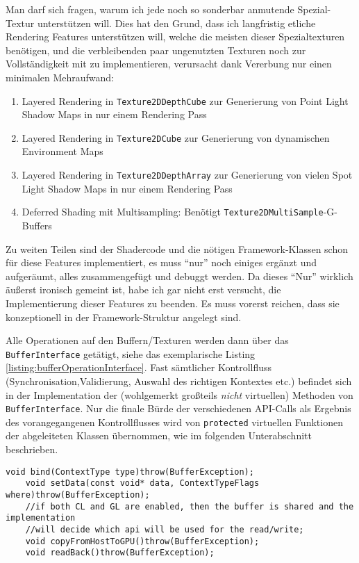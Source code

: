 	Man darf sich fragen, warum ich jede noch so sonderbar anmutende Spezial-Textur unterstützen will. Dies
	hat den Grund, dass ich langfristig etliche Rendering Features unterstützen will, welche die meisten dieser 	
	Spezialtexturen benötigen, und die verbleibenden paar ungenutzten Texturen noch zur Vollständigkeit mit zu 
	implementieren, verursacht dank Vererbung nur einen minimalen Mehraufwand:
	\begin{enumerate}
		\item Layered Rendering in \lstinline|Texture2DDepthCube| zur Generierung von Point Light Shadow Maps
		in nur einem Rendering Pass
		\item Layered Rendering in \lstinline|Texture2DCube| zur Generierung von dynamischen Environment Maps
		\item  Layered Rendering in \lstinline|Texture2DDepthArray| zur Generierung von vielen Spot Light Shadow Maps
		in nur einem Rendering Pass
		\item Deferred Shading mit Multisampling: Benötigt \lstinline|Texture2DMultiSample|-G-Buffers
	\end{enumerate}
	Zu weiten Teilen sind der Shadercode und die nötigen Framework-Klassen schon für diese Features implementiert,
	es muss "`nur"' noch einiges ergänzt und aufgeräumt, alles zusammengefügt und debuggt werden. 
	Da dieses "`Nur"' wirklich äußerst ironisch gemeint ist, habe ich gar nicht erst versucht, 
	die Implementierung dieser Features zu beenden. Es muss vorerst reichen,
	dass sie konzeptionell in der Framework-Struktur angelegt sind.
	
	
	
	Alle Operationen auf den Buffern/Texturen werden dann über das \lstinline|BufferInterface|
	getätigt, siehe das exemplarische Listing \ref{listing:bufferOperationInterface}. 
	Fast sämtlicher Kontrollfluss (Synchronisation,Validierung, Auswahl des richtigen Kontextes etc.)
	befindet sich in der Implementation	der (wohlgemerkt großteils \emph{nicht} virtuellen) 
	Methoden von \lstinline|BufferInterface|. 
	Nur die finale Bürde der verschiedenen API-Calls als Ergebnis des vorangegangenen Kontrollflusses
	wird von \lstinline|protected| virtuellen Funktionen der abgeleiteten Klassen übernommen, wie im folgenden 	
	Unterabschnitt beschrieben.
	
\begin{lstlisting}[caption={Operationen auf dem BufferInterface, Ausschnitt},label=listing:bufferOperationInterface]		
	void bind(ContextType type)throw(BufferException);
	void setData(const void* data, ContextTypeFlags where)throw(BufferException);
	//if both CL and GL are enabled, then the buffer is shared and the implementation
	//will decide which api will be used for the read/write;
	void copyFromHostToGPU()throw(BufferException);
	void readBack()throw(BufferException);
\end{lstlisting}
	
